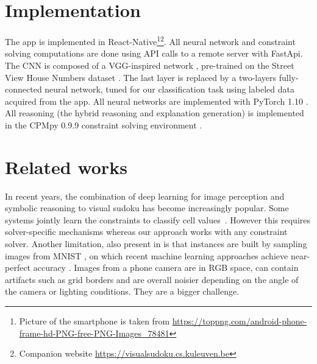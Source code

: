 \documentclass[letterpaper]{article} %
\begin{document}
\section{Implementation} 
The app is implemented in React-Native\footnote{Picture of the smartphone is taken from \url{https://toppng.com/android-phone-frame-hd-PNG-free-PNG-Images_78481}}\footnote{Companion website \url{https://visualsudoku.cs.kuleuven.be}}. All neural network and constraint solving computations are done using API calls to a remote server with FastApi. 
The CNN is composed of a VGG-inspired network \cite{VGG}, pre-trained on the Street View House Numbers dataset \cite{SVHN}. 
The last layer is replaced by a two-layers fully-connected neural network, tuned for our classification task using labeled data acquired from the app. All neural networks are implemented with PyTorch 1.10 \cite{pytorch}. All reasoning (the hybrid reasoning and explanation generation) is implemented in the CPMpy 0.9.9 constraint solving environment \cite{cpmpy}.


\section{Related works}
In recent years, the combination of deep learning for image perception and symbolic reasoning to visual sudoku has become increasingly popular.
Some systems jointly learn the constraints to classify cell values~\cite{Pushing, SATNet, NeurASP}. 
However this requires solver-specific mechanisms whereas our approach works with any constraint  solver. 
Another limitation, also present in \cite{CLRD, mulamba2020hybrid} is that instances are built by sampling images from MNIST \cite{mnist}, on which recent machine learning approaches achieve near-perfect accuracy \cite{ensemble-mnist}. Images from a phone camera are in RGB space, can contain artifacts such as grid borders and are overall noisier depending on the angle of the camera or lighting conditions. They are a bigger challenge. 
\end{document}
